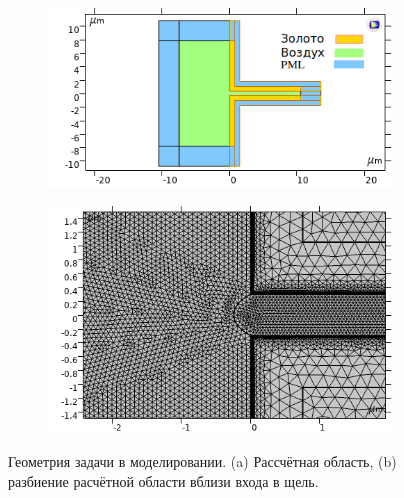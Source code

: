 \begin{figure}
    \begin{subfigure}[t]{\textwidth}
        \centering
        \includegraphics[width=\textwidth]{figures/Geometry2_gold.png}
        \caption{}
    \end{subfigure}
    \begin{subfigure}[t]{\textwidth}
        \centering
        \includegraphics[width=\textwidth]{figures/mesh.png}
        \caption{}
    \end{subfigure}
        \caption{Геометрия задачи в моделировании. (a) Рассчётная область, (b) разбиение расчётной области вблизи входа в щель.}
        \label{fig:Comp_dom}
\end{figure}

